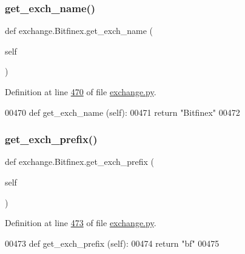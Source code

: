 \subsubsection{\texorpdfstring{get\+\_\+exch\+\_\+name()}{get\_exch\_name()}}
{\footnotesize\ttfamily def exchange.\+Bitfinex.\+get\+\_\+exch\+\_\+name (\begin{DoxyParamCaption}\item[{}]{self }\end{DoxyParamCaption})}



Definition at line \hyperlink{exchange_8py_source_l00470}{470} of file \hyperlink{exchange_8py_source}{exchange.\+py}.


\begin{DoxyCode}
00470     \textcolor{keyword}{def }get\_exch\_name (self):
00471         \textcolor{keywordflow}{return} \textcolor{stringliteral}{"Bitfinex"}
00472     
\end{DoxyCode}
\mbox{\label{classexchange_1_1_bitfinex_a99f65e8aad1c14b80bbb1765f33640c8}} 
\subsubsection{\texorpdfstring{get\+\_\+exch\+\_\+prefix()}{get\_exch\_prefix()}}
{\footnotesize\ttfamily def exchange.\+Bitfinex.\+get\+\_\+exch\+\_\+prefix (\begin{DoxyParamCaption}\item[{}]{self }\end{DoxyParamCaption})}



Definition at line \hyperlink{exchange_8py_source_l00473}{473} of file \hyperlink{exchange_8py_source}{exchange.\+py}.


\begin{DoxyCode}
00473     \textcolor{keyword}{def }get\_exch\_prefix (self):
00474         \textcolor{keywordflow}{return} \textcolor{stringliteral}{"bf"}
00475         
\end{DoxyCode}
\mbox{\label{classexchange_1_1_bitfinex_a1d74178897b4ac36c8ed6b4523f539f5}} 
